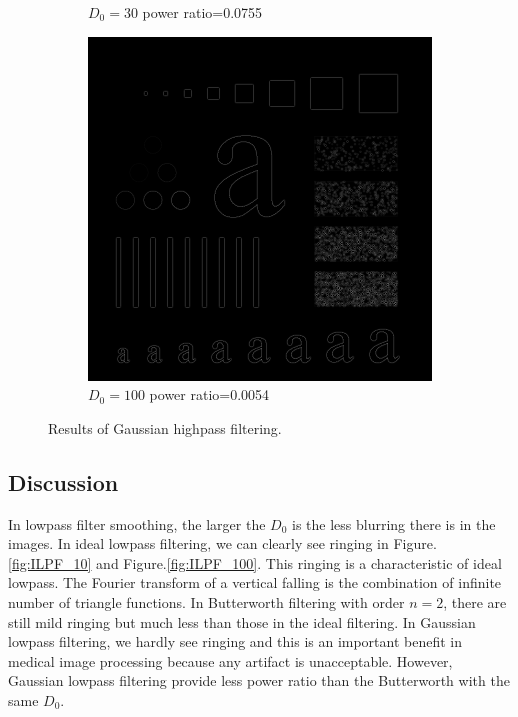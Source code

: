\begin{figure}[h!]
\begin{subfigure}[b]{0.3\linewidth}
		\caption{$D_0=30$ power ratio=0.0755}
		\label{fig:GHPF_30}
	\end{subfigure}
	\begin{subfigure}[b]{0.3\linewidth}
		\includegraphics[width=\linewidth]{myfigure/p3/GHPF_100.png}
		\caption{$D_0=100$ power ratio=0.0054}
		\label{fig:GHPF_100}
	\end{subfigure}
  	\caption{Results of Gaussian highpass filtering.}
  	\label{fig:GHPF}
\end{figure}


\subsection{Discussion}
In lowpass filter smoothing, the larger the $D_0$ is the less blurring there is in the images. In ideal lowpass filtering, we can clearly see ringing in Figure.\ref{fig:ILPF_10} and Figure.\ref{fig:ILPF_100}. This ringing is a characteristic of ideal lowpass. The Fourier transform of a vertical falling is the combination of infinite number of triangle functions. In Butterworth filtering with order $n=2$, there are still mild ringing but much less than those in the ideal filtering. In Gaussian lowpass filtering, we hardly see ringing and this is an important benefit in medical image processing because any artifact is unacceptable. However, Gaussian lowpass filtering provide less power ratio than the Butterworth with the same $D_0$. \\

